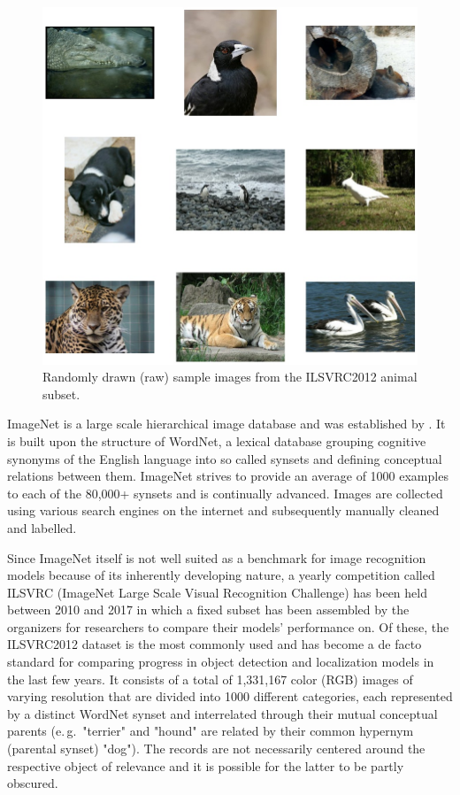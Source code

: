 \begin{figure}[tb]
    \centering
	    \includegraphics[width=\textwidth]{thesis/graphics/images/ilsvrc2012_as_sample_images.jpg}
    \caption{Randomly drawn (raw) sample images from the ILSVRC2012 animal subset.}
    \label{fig:experiments_imagenet_sample_images}
\end{figure}               

ImageNet is a large scale hierarchical image database and was established by \cite{Deng2009-iz}. It is built upon the structure of WordNet, a lexical database grouping cognitive synonyms of the English language into so called synsets and defining conceptual relations between them. ImageNet strives to provide an average of 1000 examples to each of the 80,000+ synsets and is continually advanced. Images are collected using various search engines on the internet and subsequently manually cleaned and labelled.

Since ImageNet itself is not well suited as a benchmark for image recognition models because of its inherently developing nature, a yearly competition called ILSVRC (ImageNet Large Scale Visual Recognition Challenge) has been held between 2010 and 2017 in which a fixed subset has been assembled by the organizers for researchers to compare their models' performance on. Of these, the ILSVRC2012 dataset is the most commonly used and has become a de facto standard for comparing progress in object detection and localization models in the last few years. It consists of a total of 1,331,167 color (RGB) images of varying resolution that are divided into 1000 different categories, each represented by a distinct WordNet synset and interrelated through their mutual conceptual parents (e.\,g.\ "terrier" and "hound" are related by their common hypernym (parental synset) "dog"). The records are not necessarily centered around the respective object of relevance and it is possible for the latter to be partly obscured.

